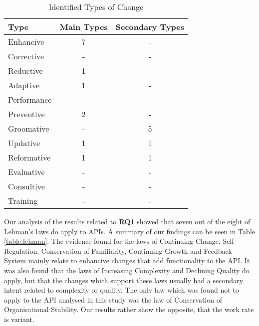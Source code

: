 \documentclass{sig-alternate}
\begin{document}
\begin{table}
       \centering
       \begin{tabular}[ht]{l|c|c}
              \toprule

              \textbf{Type}        & \textbf{Main Types}       &\textbf{Secondary Types}   \\ \midrule
              Enhancive            & 7                         & -                         \\ \hline
              Corrective           & -                         & -                         \\ \hline
              Reductive            & 1                         & -                         \\ \hline
              Adaptive             & 1                         & -                         \\ \hline
              Performance          & -                         & -                         \\ \hline
              Preventive           & 2                         & -                         \\ \hline
              Groomative           & -                         & 5                         \\ \hline
              Updative             & 1                         & 1                         \\ \hline
              Reformative          & 1                         & 1                         \\ \hline
              Evaluative           & -                         & -                         \\ \hline
              Consultive           & -                         & -                         \\ \hline
              Training             & -                         & -                         \\ 

              \bottomrule

       \end{tabular}
       \caption{Identified Types of Change}
       \label{table:type_counts}
\end{table}

Our analysis of the results related to \textbf{RQ1} showed that seven out of the eight of Lehman's laws \cite{lehman90sview} do apply to APIs. 
A summary of our findings can be seen in Table \ref{table:lehman}. 
The evidence found for the laws of Continuing Change, Self Regulation, Conservation of Familiarity, Continuing Growth and Feedback System mainly relate to enhancive changes that add functionality to the API. 
It was also found that the laws of Increasing Complexity and Declining Quality do apply, but that the changes which support these laws usually had a secondary intent related to complexity or quality. The only law which was found not to apply to the API analysed in this study was the law of Conservation of Organisational Stability. Our results rather show the opposite, that the work rate is variant. 
\end{document}

